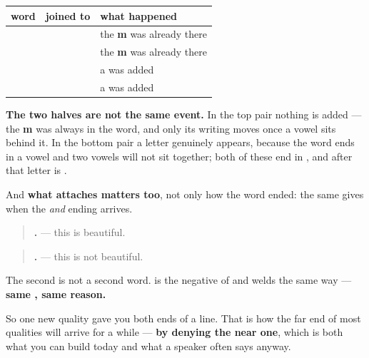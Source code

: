 \begin{grammarlens}[title={Grammar Lens: two different events}]
\noindent
\begin{tabularx}{\linewidth}{@{}>{\raggedright\arraybackslash}X>{\raggedright\arraybackslash}X>{\raggedright\arraybackslash}X@{}}
\toprule
\textbf{word} & \textbf{joined to \textbf{\ml{ആണ്}}} & \textbf{what happened} \\
\midrule
\textbf{\ml{എളുപ്പം}} & \textbf{\ml{എളുപ്പമാണ്}} & the \textbf{m} was already there \\
\textbf{\ml{സുന്ദരം}} & \textbf{\ml{സുന്ദരമാണ്}} & the \textbf{m} was already there \\
\textbf{\ml{കുട്ടി}} & \textbf{\ml{കുട്ടിയാണ്}} & a \textbf{\ml{യ}} was added \\
\textbf{\ml{ഭംഗി}} & \textbf{\ml{ഭംഗിയാണ്}} & a \textbf{\ml{യ}} was added \\
\bottomrule
\end{tabularx}

\textbf{The two halves are not the same event.} In the top pair nothing is added — the \textbf{m} was always in the word, and only its writing moves once a vowel sits behind it. In the bottom pair a letter genuinely appears, because the word ends in a vowel and two vowels will not sit together; both of these end in \textbf{}, and after \textbf{} that letter is \textbf{}.

And \textbf{what attaches matters too}, not only how the word ended: the same \textbf{} gives \textbf{} when the \emph{and} ending arrives.
\end{grammarlens}

\begin{grammarlens}[title={What you've built}]
\begin{quote}
\textbf{ .} — this is beautiful.
\end{quote}

\begin{quote}
\textbf{ .} — this is not beautiful.
\end{quote}

The second is not a second word. \textbf{} is the negative of \textbf{} and welds the same way — \textbf{same , same reason.}

So one new quality gave you both ends of a line. That is how the far end of most qualities will arrive for a while — \textbf{by denying the near one}, which is both what you can build today and what a speaker often says anyway.
\end{grammarlens}

